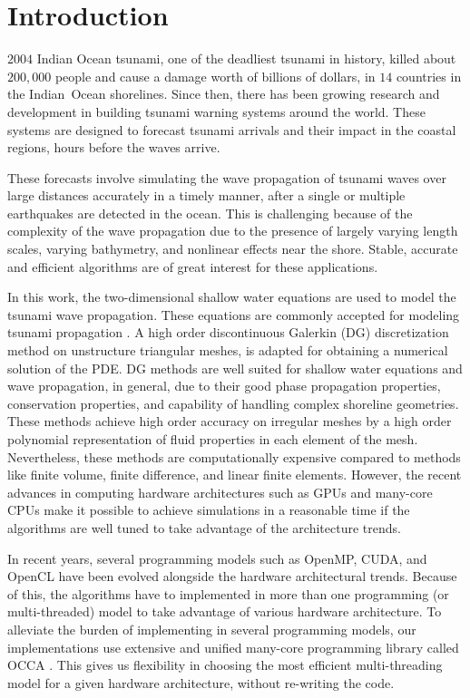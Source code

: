 \section{Introduction}
\label{sec:intro}

$2004$ Indian Ocean tsunami, one of the deadliest tsunami in history, killed about $200,000$ people and cause a damage worth of billions of dollars, in $14$ countries in the Indian\ Ocean shorelines. Since then, there has been growing research and development in building tsunami warning systems around the world. These systems are designed to forecast tsunami arrivals and their impact in the coastal regions, hours before the waves arrive. 

 These forecasts involve simulating the wave propagation of tsunami waves over  large distances accurately in a timely manner, after a single or multiple earthquakes are detected in the ocean. This is challenging because of 
the complexity of the wave propagation due to the presence of largely varying length scales, varying bathymetry, and nonlinear effects near the shore. Stable, accurate and efficient algorithms are of great interest for these applications.

In this work, the two-dimensional shallow water equations are used to model the tsunami wave propagation. These equations are commonly accepted for modeling tsunami propagation \cite{george2006finite}. A high order discontinuous Galerkin (DG) discretization method on unstructure triangular meshes, is adapted for obtaining a numerical solution of the PDE. DG  methods are well suited for shallow water equations and wave propagation, in general, due to their good phase propagation properties, conservation properties, and capability of handling complex shoreline geometries. These methods achieve high order accuracy on irregular meshes by a high order polynomial representation of fluid properties in each element of the mesh. Nevertheless, these methods are computationally expensive compared to methods like finite volume, finite difference, and linear finite elements. However,  the recent advances in computing hardware architectures such as GPUs and many-core CPUs make it possible to achieve simulations in a reasonable time if the algorithms are well tuned to take advantage of the architecture trends. 

In recent years, several programming models such as OpenMP, CUDA, and OpenCL have been evolved alongside the hardware architectural trends. Because of this, the algorithms have to implemented in more than one programming (or multi-threaded) model to take advantage of various hardware architecture. To alleviate the burden of implementing in several programming models, our implementations use extensive and unified many-core programming library called OCCA \cite{occa2}. This gives us flexibility in choosing the most efficient multi-threading model for a given hardware architecture, without re-writing the code.
 
